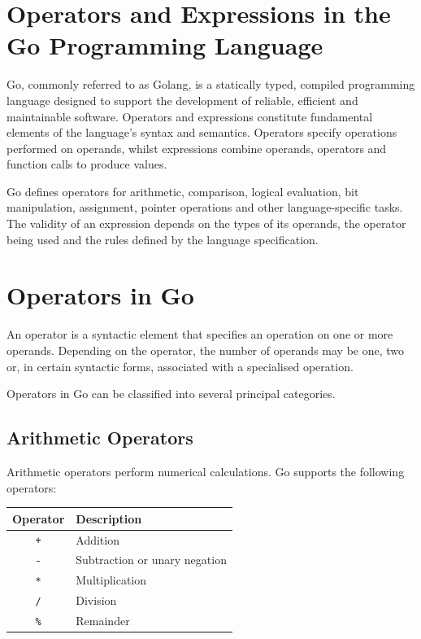 \section{Operators and Expressions in the Go Programming Language}

Go, commonly referred to as Golang, is a statically typed,
compiled programming language designed to support the development
of reliable, efficient and maintainable software. Operators and
expressions constitute fundamental elements of the language's
syntax and semantics. Operators specify operations performed on
operands, whilst expressions combine operands, operators and
function calls to produce values.

Go defines operators for arithmetic, comparison, logical
evaluation, bit manipulation, assignment, pointer operations and
other language-specific tasks. The validity of an expression
depends on the types of its operands, the operator being used
and the rules defined by the language specification.

\section{Operators in Go}

An operator is a syntactic element that specifies an operation
on one or more operands. Depending on the operator, the number
of operands may be one, two or, in certain syntactic forms,
associated with a specialised operation.

Operators in Go can be classified into several principal
categories.

\subsection{Arithmetic Operators}

Arithmetic operators perform numerical calculations. Go supports
the following operators:

\begin{center}
\begin{tabular}{|c|l|}
\hline
\textbf{Operator} & \textbf{Description} \\
\hline
\texttt{+} & Addition \\
\texttt{-} & Subtraction or unary negation \\
\texttt{*} & Multiplication \\
\texttt{/} & Division \\
\texttt{\%} & Remainder \\
\hline
\end{tabular}
\end{center}


